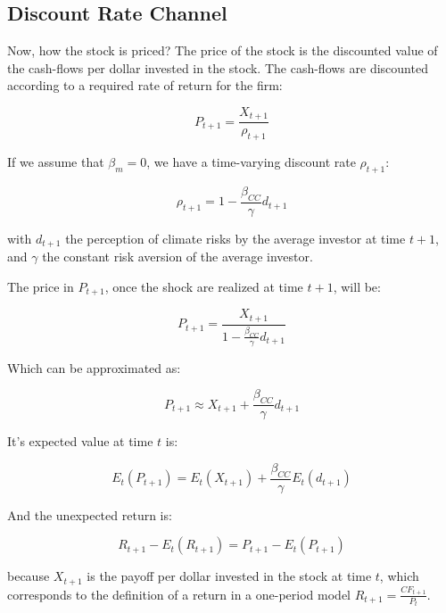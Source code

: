 \subsection{Discount Rate Channel}

Now, how the stock is priced? 
The price of the stock is the discounted value of the 
cash-flows per dollar invested in the stock.
The cash-flows are discounted according 
to a required rate of return for the firm:

\begin{equation}
    P_{t+1} = \frac{X_{t+1}}{\rho_{t+1}}
\end{equation}

If we assume that $\beta_m = 0$,
we have a time-varying discount rate $\rho_{t+1}$:

\begin{equation}
    \rho_{t+1} = 1 - \frac{\beta_{CC}}{\gamma} d_{t+1}
\end{equation}

with $d_{t+1}$ the perception of climate 
risks by the average investor at time $t+1$,
and $\gamma$ the constant risk aversion of 
the average investor.

The price in $P_{t+1}$, once 
the shock are realized at time $t+1$, will be:

\begin{equation}
    P_{t+1} = \frac{X_{t+1}}{1 - \frac{\beta_{CC}}{\gamma}d_{t+1}}
\end{equation}

Which can be approximated as:

\begin{equation}
    P_{t+1} \approx X_{t+1} + \frac{\beta_{CC}}{\gamma}d_{t+1}
\end{equation}

It's expected value at time $t$ is:

\begin{equation}
    E_t(P_{t+1}) = E_t(X_{t+1}) + \frac{\beta_{CC}}{\gamma}E_t(d_{t+1})
\end{equation}

And the unexpected return is:

\begin{equation}
    R_{t+1} - E_t(R_{t+1}) = P_{t+1} - E_t(P_{t+1})
\end{equation}

because $X_{t+1}$ is the payoff per dollar invested in the stock at time $t$,
which corresponds to the definition of a return in a 
one-period model $R_{t+1} = \frac{CF_{t+1}}{P_t}$.

